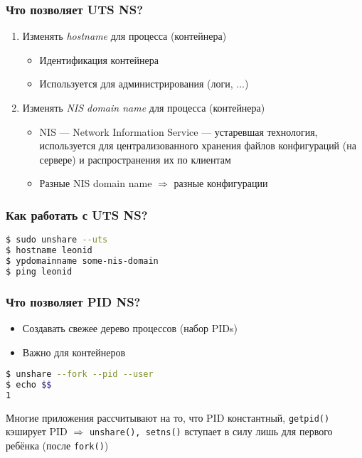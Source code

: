 \begin{frame}[label={uts_ns_usage}]
\frametitle{Что позволяет UTS NS?}
\begin{enumerate}
	\item \alert{Изменять \emph{hostname}} для процесса (контейнера)
	\begin{itemize}
		\item Идентификация контейнера
		\item Используется для администрирования (логи, ...)
	\end{itemize}
	\item \alert{Изменять \emph{NIS domain name}} для процесса (контейнера)
	\begin{itemize}
		\item NIS --- Network Information Service --- устаревшая технология, используется для централизованного хранения файлов конфигураций (на сервере) и распространения их по клиентам
		\item Разные NIS domain name $\Rightarrow$ разные конфигурации
	\end{itemize}
\end{enumerate}
\end{frame}

\begin{frame}[fragile]
\frametitle{Как работать с UTS NS?}
\begin{lstlisting}[language=bash, basicstyle={\normalsize\ttfamily}]
$ sudo unshare --uts
$ hostname leonid
$ ypdomainname some-nis-domain
$ ping leonid
\end{lstlisting}
\end{frame}

\begin{frame}[fragile, label={pid_ns_usage}]
\frametitle{Что позволяет PID NS?}
\begin{itemize}
	\item Создавать свежее дерево процессов (набор PIDs)
	\item Важно для контейнеров
\end{itemize}

\begin{block}{}
\begin{lstlisting}[language=bash, basicstyle={\normalsize\ttfamily}]
$ unshare --fork --pid --user
$ echo $$
1
\end{lstlisting}
\end{block}

Многие приложения рассчитывают на то, что PID константный, \texttt{getpid()} кэширует PID $\Longrightarrow$ \texttt{unshare(), setns()} вступает в силу лишь для первого ребёнка (после \texttt{fork()})

\end{frame}

